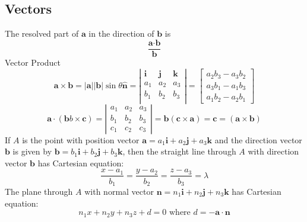     \subsection{Vectors}
    The resolved part of $\textbf{a}$ in the direction of $\textbf{b}$ is
    \begin{equation}
        \frac{\textbf{a}\cdot\textbf{b}}{\textbf{b}}
    \end{equation}
    Vector Product
    \begin{equation}
        \textbf{a}\times\textbf{b}=|\textbf{a}||\textbf{b}|\sin\theta\hat{\textbf{n}}=\left|
            \begin{matrix}
                \textbf{i} & \textbf{j} & \textbf{k} \\
                a_1 & a_2 & a_3 \\
                b_1 & b_2 & b_3 \\
            \end{matrix}
        \right|=
        \begin{bmatrix}
            a_2b_3-a_3b_2 \\
            a_3b_1-a_1b_3 \\
            a_1b_2-a_2b_1
        \end{bmatrix}
    \end{equation}
    \begin{equation}
        \textbf{a}\cdot(\textbf{b}b\times\textbf{c})=\left|
            \begin{matrix}
                a_1 & a_2 & a_3 \\
                b_1 & b_2 & b_3 \\
                c_1 & c_2 & c_3
            \end{matrix}
        \right|=\textbf{b}(\textbf{c}\times\textbf{a})=\textbf{c}=(\textbf{a}\times\textbf{b})
    \end{equation}
    If $A$ is the point with position vector $\textbf{a}=a_1\textbf{i}+a_2\textbf{j}+a_3\textbf{k}$ and the direction vector $\textbf{b}$ is given by $\textbf{b}=b_1\textbf{i}+b_2\textbf{j}+b_3\textbf{k}$, then the straight line through $A$ with direction vector $\textbf{b}$ has Cartesian equation:
    \begin{equation}
        \frac{x-a_1}{b_1}=\frac{y-a_2}{b_2}=\frac{z-a_3}{b_3}=\lambda
    \end{equation}
    The plane through $A$ with normal vector $\textbf{n}=n_1\textbf{i}+n_2\textbf{j}+n_3\textbf{k}$ has Cartesian equation:
    \begin{equation}
        n_1x+n_2y+n_3z+d=0\text{ where }d=-\textbf{a}\cdot\textbf{n}
    \end{equation}
